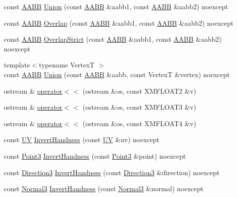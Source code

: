 \begin{DoxyCompactItemize}
\item 
const \hyperlink{structmage_1_1_a_a_b_b}{A\+A\+BB} \hyperlink{namespacemage_a1ace5b92afcdd7a85b75118a61b8dda1}{Union} (const \hyperlink{structmage_1_1_a_a_b_b}{A\+A\+BB} \&aabb1, const \hyperlink{structmage_1_1_a_a_b_b}{A\+A\+BB} \&aabb2) noexcept
\item 
const \hyperlink{structmage_1_1_a_a_b_b}{A\+A\+BB} \hyperlink{namespacemage_a69f643f9ee655b4fcd1c9347a3dba2be}{Overlap} (const \hyperlink{structmage_1_1_a_a_b_b}{A\+A\+BB} \&aabb1, const \hyperlink{structmage_1_1_a_a_b_b}{A\+A\+BB} \&aabb2) noexcept
\item 
const \hyperlink{structmage_1_1_a_a_b_b}{A\+A\+BB} \hyperlink{namespacemage_a27f8b423f942bafffcf15c9b2d4daf71}{Overlap\+Strict} (const \hyperlink{structmage_1_1_a_a_b_b}{A\+A\+BB} \&aabb1, const \hyperlink{structmage_1_1_a_a_b_b}{A\+A\+BB} \&aabb2) noexcept
\item 
{\footnotesize template$<$typename VertexT $>$ }\\const \hyperlink{structmage_1_1_a_a_b_b}{A\+A\+BB} \hyperlink{namespacemage_a5f8ebbbef7be24b679e6a8f31a9c4ad5}{Union} (const \hyperlink{structmage_1_1_a_a_b_b}{A\+A\+BB} \&aabb, const VertexT \&vertex) noexcept
\item 
ostream \& \hyperlink{namespacemage_ac348ad49bf7e9912aa70cda1b0ca553d}{operator$<$$<$} (ostream \&os, const X\+M\+F\+L\+O\+A\+T2 \&v)
\item 
ostream \& \hyperlink{namespacemage_a44b2d3046802608544402245919f219b}{operator$<$$<$} (ostream \&os, const X\+M\+F\+L\+O\+A\+T3 \&v)
\item 
ostream \& \hyperlink{namespacemage_af6c1d1c5718d611450932bde30d2bfef}{operator$<$$<$} (ostream \&os, const X\+M\+F\+L\+O\+A\+T4 \&v)
\item 
const \hyperlink{structmage_1_1_u_v}{UV} \hyperlink{namespacemage_ac89935dc54be6ddaa1cc35e9dafdc302}{Invert\+Handness} (const \hyperlink{structmage_1_1_u_v}{UV} \&uv) noexcept
\item 
const \hyperlink{structmage_1_1_point3}{Point3} \hyperlink{namespacemage_acad329d95355dc4cf7835e7a0d5e5d32}{Invert\+Handness} (const \hyperlink{structmage_1_1_point3}{Point3} \&point) noexcept
\item 
const \hyperlink{structmage_1_1_direction3}{Direction3} \hyperlink{namespacemage_a24177301a6412c9db6ac5dccea11ec9e}{Invert\+Handness} (const \hyperlink{structmage_1_1_direction3}{Direction3} \&direction) noexcept
\item 
const \hyperlink{structmage_1_1_normal3}{Normal3} \hyperlink{namespacemage_ae62ff8d811ab629a170869ec8a607110}{Invert\+Handness} (const \hyperlink{structmage_1_1_normal3}{Normal3} \&normal) noexcept

\end{DoxyCompactItemize}
